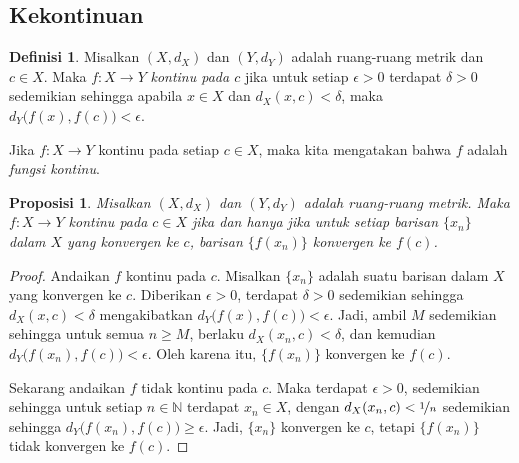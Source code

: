 \documentclass[12pt,openany]{book}
\newcommand{\N}{{\mathbb{N}}}
\theoremstyle{plain}
\newtheorem{prop}[thm]{Proposisi}
\theoremstyle{remark}
\theoremstyle{definition}
\newtheorem{defn}[thm]{Definisi}
\theoremstyle{exercise}
\theoremstyle{example}
\begin{document}
\subsection{Kekontinuan}

\begin{defn}
Misalkan $(X,d_X)$ dan $(Y,d_Y)$ adalah ruang-ruang metrik dan $c \in X$.
Maka $f \colon X \to Y$
\emph{kontinu pada $c$}
jika untuk setiap $\epsilon > 0$
terdapat $\delta > 0$ sedemikian sehingga apabila $x \in X$ dan $d_X(x,c) <
\delta$, maka
$d_Y\bigl(f(x),f(c)\bigr) < \epsilon$.

Jika $f \colon X \to Y$ kontinu pada setiap $c \in X$, maka kita mengatakan
bahwa $f$ adalah \emph{fungsi kontinu}.
\end{defn}

\begin{prop} \label{prop:contiscont}
Misalkan $(X,d_X)$ dan $(Y,d_Y)$ adalah ruang-ruang metrik.
Maka $f \colon X \to Y$
kontinu pada $c \in X$
jika dan hanya jika untuk setiap barisan $\{ x_n \}$ dalam $X$
yang konvergen ke $c$, barisan $\{ f(x_n) \}$ konvergen
ke $f(c)$.
\end{prop}

\begin{proof}
Andaikan $f$ kontinu pada $c$.  Misalkan $\{ x_n \}$ adalah suatu
barisan dalam $X$ yang konvergen ke $c$.  Diberikan $\epsilon > 0$,
terdapat $\delta > 0$ sedemikian sehingga $d_X(x,c) < \delta$ mengakibatkan
$d_Y\bigl(f(x),f(c)\bigr) < \epsilon$.  Jadi, ambil $M$ sedemikian sehingga
untuk semua $n \geq M$, berlaku $d_X(x_n,c) < \delta$, dan kemudian
$d_Y\bigl(f(x_n),f(c)\bigr) < \epsilon$.  Oleh karena itu, $\{ f(x_n) \}$
konvergen ke $f(c)$.

Sekarang andaikan $f$ tidak kontinu pada $c$.
Maka terdapat $\epsilon > 0$,
sedemikian sehingga untuk setiap $n \in \N$ terdapat $x_n \in X$,
dengan
$d_X(x_n,c) < \nicefrac{1}{n}$ sedemikian sehingga $d_Y\bigl(f(x_n),f(c)\bigr) \geq
\epsilon$.  Jadi, $\{ x_n \}$ konvergen ke $c$, tetapi $\{ f(x_n) \}$
tidak konvergen ke $f(c)$.
\end{proof}
\end{document}
